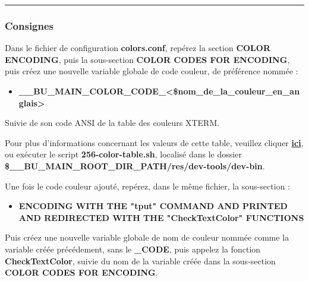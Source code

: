 \documentclass[a4paper,10pt]{article}
\begin{document}

\color{blue}\par\noindent\rule{\textwidth}{0.4pt}\color{white}

\color{blue}
\subsubsection{Consignes}\color{white}

\begin{justify}
    Dans le fichier de configuration \textbf{\color{lime}colors.conf}, repérez la section \textbf{COLOR ENCODING}, puis la sous-section \textbf{COLOR CODES FOR ENCODING}, puis créez une nouvelle variable globale de code couleur, de préférence nommée :

    \begin{itemize}
        \item \textbf{\color{orange}\_\_BU\_MAIN\_COLOR\_CODE\_<\$nom\_de\_la\_couleur\_en\_anglais>}\\
    \end{itemize}
\end{justify}

\begin{justify}
    Suivie de son code ANSI de la table des couleurs XTERM.
\end{justify}

\begin{justify}
    Pour plus d'informations concernant les valeurs de cette table, veuillez cliquer \href{https://unix.stackexchange.com/questions/269077/tput-setaf-color-table-how-to-determine-color-codes/269085#269085}{\textbf{ici}}, ou exécuter le script \textbf{\color{lime}256-color-table.sh}, localisé dans le dossier \textbf{\color{orange}\$\_\_BU\_MAIN\_ROOT\_DIR\_PATH\color{lime}/res/dev-tools/dev-bin}.
\end{justify}

\begin{justify}
    Une fois le code couleur ajouté, repérez, dans le même fichier, la sous-section :\\

    \begin{itemize}
        \item \textbf{ENCODING WITH THE "tput" COMMAND AND PRINTED AND REDIRECTED WITH THE "CheckTextColor" FUNCTIONS}
    \end{itemize}
\end{justify}

\begin{justify}
    Puis créez une nouvelle variable globale de nom de couleur nommée comme la variable créée précédement, sans le \textbf{\color{orange}\_CODE}, puis appelez la fonction \textbf{\color{mauve}CheckTextColor}, suivie du nom de la variable créée dans la sous-section \textbf{COLOR CODES FOR ENCODING}.
\end{justify}
\end{document}
